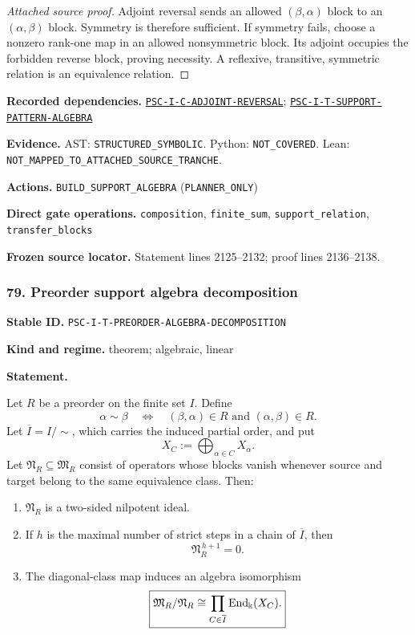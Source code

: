 \documentclass[a4paper,11pt]{article}
\newcommand{\bbk}{\Bbbk}\newcommand{\A}{\mathcal A}\newcommand{\B}{\mathcal B}\newcommand{\Ccal}{\mathcal C}\newcommand{\Pcal}{\mathcal P}\newcommand{\Qcal}{\mathcal Q}\newcommand{\Rcal}{\mathcal R}\newcommand{\Scal}{\mathcal S}
\newcommand{\field}[2]{\noindent\textbf{#1.} #2\par}
\begin{document}
\begin{proof}[Attached source proof]
Adjoint reversal sends an allowed $(\beta,\alpha)$ block to an $(\alpha,\beta)$ block.  Symmetry is therefore sufficient.  If symmetry fails, choose a nonzero rank-one map in an allowed nonsymmetric block.  Its adjoint occupies the forbidden reverse block, proving necessity.  A reflexive, transitive, symmetric relation is an equivalence relation.
\end{proof}
\field{Recorded dependencies}{\hyperref[rec:PSC-I-C-ADJOINT-REVERSAL]{\nolinkurl{PSC-I-C-ADJOINT-REVERSAL}}; \hyperref[rec:PSC-I-T-SUPPORT-PATTERN-ALGEBRA]{\nolinkurl{PSC-I-T-SUPPORT-PATTERN-ALGEBRA}}}
\field{Evidence}{AST: \nolinkurl{STRUCTURED_SYMBOLIC}. Python: \nolinkurl{NOT_COVERED}. Lean: \nolinkurl{NOT_MAPPED_TO_ATTACHED_SOURCE_TRANCHE}.}
\field{Actions}{\nolinkurl{BUILD_SUPPORT_ALGEBRA} (\nolinkurl{PLANNER_ONLY})}
\field{Direct gate operations}{\nolinkurl{composition}, \nolinkurl{finite_sum}, \nolinkurl{support_relation}, \nolinkurl{transfer_blocks}}
\field{Frozen source locator}{Statement lines 2125--2132; proof lines 2136--2138.}
\subsubsection*{79. Preorder support algebra decomposition}
\label{rec:PSC-I-T-PREORDER-ALGEBRA-DECOMPOSITION}
\field{Stable ID}{\nolinkurl{PSC-I-T-PREORDER-ALGEBRA-DECOMPOSITION}}
\field{Kind and regime}{theorem; algebraic, linear}
\textbf{Statement.}\par
Let $R$ be a preorder on the finite set $I$.  Define
\[
\alpha\sim\beta
\quad\Longleftrightarrow\quad
(\beta,\alpha)\in R\text{ and }(\alpha,\beta)\in R.
\]
Let $\overline I=I/{\sim}$, which carries the induced partial order, and put
\[
X_C:=\bigoplus_{\alpha\in C}X_\alpha.
\]
Let $\mathfrak N_R\subseteq\mathfrak M_R$ consist of operators whose blocks vanish whenever source and target belong to the same equivalence class.  Then:
\begin{enumerate}[label=(\roman*)]
\item $\mathfrak N_R$ is a two-sided nilpotent ideal.
\item If $h$ is the maximal number of strict steps in a chain of $\overline I$, then
\[
\mathfrak N_R^{\,h+1}=0.
\]
\item The diagonal-class map induces an algebra isomorphism
\[
\boxed{
\mathfrak M_R/\mathfrak N_R
\cong
\prod_{C\in\overline I}\End_{\bbk}(X_C).
}
\]
\end{enumerate}
\end{document}
